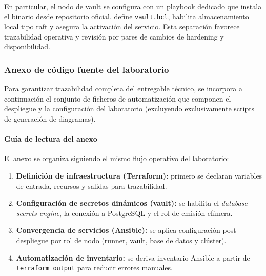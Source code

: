 \documentclass[runningheads]{llncs}
\begin{document}
En particular, el nodo de \gls{vault} se configura con un playbook dedicado que instala el binario desde repositorio oficial, define \texttt{vault.hcl}, habilita almacenamiento local tipo \gls{raft} y asegura la activación del servicio. Esta separación favorece trazabilidad operativa y revisión por pares de cambios de hardening y disponibilidad.



\subsubsection{Anexo de código fuente del laboratorio}
Para garantizar trazabilidad completa del entregable técnico, se incorpora a continuación el conjunto de ficheros de automatización que componen el despliegue y la configuración del laboratorio (excluyendo exclusivamente scripts de generación de diagramas).

\paragraph{Guía de lectura del anexo}
El anexo se organiza siguiendo el mismo flujo operativo del laboratorio:
\begin{enumerate}
    \item \textbf{Definición de infraestructura (Terraform):} primero se declaran variables de entrada, recursos y salidas para trazabilidad.
    \item \textbf{Configuración de secretos dinámicos (\gls{vault}):} se habilita el \textit{database secrets engine}, la conexión a PostgreSQL y el rol de emisión efímera.
    \item \textbf{Convergencia de servicios (Ansible):} se aplica configuración post-despliegue por rol de nodo (runner, vault, base de datos y clúster).
    \item \textbf{Automatización de inventario:} se deriva inventario Ansible a partir de \texttt{terraform output} para reducir errores manuales.
\end{enumerate}
\end{document}
